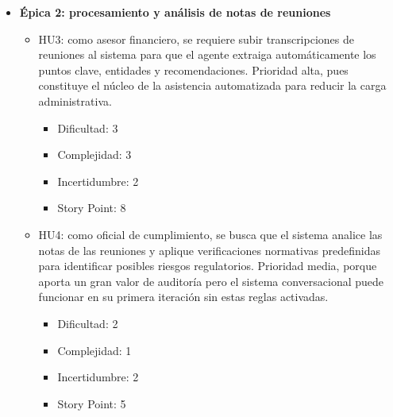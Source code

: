 \documentclass[
11pt, %
]{charter}
\begin{document}
\begin{itemize}
  \item \textbf{\'{E}pica 2: procesamiento y análisis de notas de reuniones}
    \begin{itemize}
      \item HU3: como asesor financiero, se requiere subir transcripciones de reuniones al sistema para que el agente extraiga automáticamente los puntos clave, entidades y recomendaciones. Prioridad alta, pues constituye el núcleo de la asistencia automatizada para reducir la carga administrativa. 
        \begin{itemize}
            \item Dificultad: 3
            \item Complejidad: 3
            \item Incertidumbre: 2
            \item Story Point: 8
        \end{itemize}
      \item HU4: como oficial de cumplimiento, se busca que el sistema analice las notas de las reuniones y aplique verificaciones normativas predefinidas para identificar posibles riesgos regulatorios. Prioridad media, porque aporta un gran valor de auditoría pero el sistema conversacional puede funcionar en su primera iteración sin estas reglas activadas.
        \begin{itemize}
            \item Dificultad: 2
            \item Complejidad: 1
            \item Incertidumbre: 2
            \item Story Point: 5
        \end{itemize}
    \end{itemize}


\end{itemize}
\end{document}
